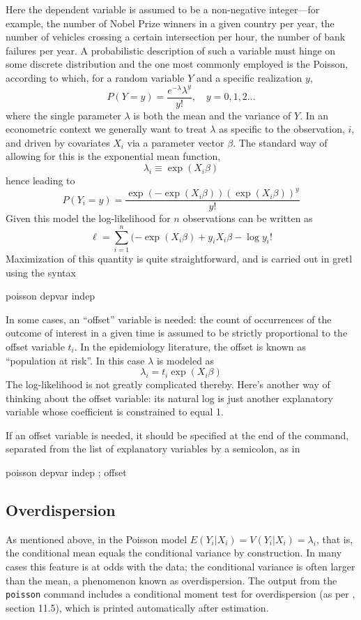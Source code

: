 Here the dependent variable is assumed to be a non-negative
integer---for example, the number of Nobel Prize winners in a given
country per year, the number of vehicles crossing a certain
intersection per hour, the number of bank failures per year. A
probabilistic description of such a variable must hinge on some
discrete distribution and the one most commonly employed is the
Poisson, according to which, for a random variable $Y$ and a specific
realization $y$,
\[
P(Y = y) = \frac{e^{-\lambda}\lambda^y}{y!}, \quad y=0,1,2\dots
\]
where the single parameter $\lambda$ is both the mean and the variance
of $Y$.  In an econometric context we generally want to treat
$\lambda$ as specific to the observation, $i$, and driven by
covariates $X_i$ via a parameter vector $\beta$. The standard way of
allowing for this is the exponential mean function,
\[
  \lambda_i \equiv \exp(X_i\beta)
\]
hence leading to
\[
P(Y_i = y) = \frac{\exp(-\exp(X_i\beta))(\exp(X_i\beta))^y}{y!}
\]
Given this model the log-likelihood for $n$ observations can be
written as
\[
\ell = \sum_{i=1}^n (-\exp(X_i\beta) + y_iX_i\beta - \log y_i!
\]
Maximization of this quantity is quite straightforward, and is carried
out in gretl using the syntax
\begin{code}
  poisson depvar indep
\end{code}

In some cases, an ``offset'' variable is needed: the count of
occurrences of the outcome of interest in a given time is assumed to
be strictly proportional to the offset variable $t_i$. In the
epidemiology literature, the offset is known as ``population at
risk''. In this case $\lambda$ is modeled as
\[
  \lambda_i = t_i \exp(X_i\beta)
\]
The log-likelihood is not greatly complicated thereby.  Here's another
way of thinking about the offset variable: its natural log is just
another explanatory variable whose coefficient is constrained to equal
1.

If an offset variable is needed, it should be specified at the end of
the command, separated from the list of explanatory variables by a
semicolon, as in
\begin{code}
  poisson depvar indep ; offset
\end{code}

\subsection{Overdispersion}

As mentioned above, in the Poisson model
$E(Y_i | X_i) = V(Y_i | X_i) = \lambda_i$, that is, the conditional
mean equals the conditional variance by construction. In many cases
this feature is at odds with the data; the conditional variance is
often larger than the mean, a phenomenon known as overdispersion. The
output from the \texttt{poisson} command includes a conditional moment
test for overdispersion (as per \citet{davidson-mackinnon04}, section
11.5), which is printed automatically after estimation.

